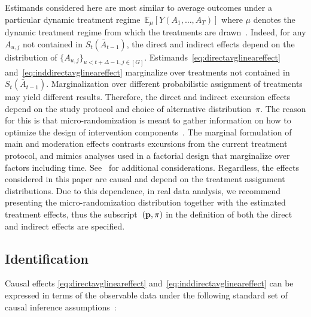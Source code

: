 \documentclass[lineno]{biometrika}
\def\E{\mathbb{E}}
\begin{document}
Estimands considered here are most similar to average outcomes under a particular dynamic treatment regime~$\E_\mu \left[ Y(A_1,\ldots, A_T)\right]$ where $\mu$ denotes the dynamic treatment regime from which the treatments are drawn~\citep{MurphyJASA2001}. Indeed, for any $A_{u,j}$ not contained in $S_t (\bar A_{t-1})$, the direct and indirect effects depend on the distribution of $\{ A_{u,j} \}_{u < t + \Delta -1, j \in [G]}$.  Estimands~\eqref{eq:directavglineareffect} and~\eqref{eq:inddirectavglineareffect} marginalize over treatments not contained in $S_t(\bar A_{t-1})$.  Marginalization over different probabilistic assignment of treatments may yield different results. Therefore, the direct and indirect excursion effects depend on the study protocol and choice of alternative distribution~$\pi$. The reason for this is that micro-randomization is meant to gather information on how to optimize the design of intervention components~\citep{Collins2018}.  The marginal formulation of main and moderation effects contrasts excursions from the current treatment protocol, and mimics analyses used in a factorial design that marginalize over factors including time. See~\citet[Section 8]{Qian2021} for additional considerations.  Regardless, the effects considered in this paper are causal and depend on the treatment assignment distributions.  Due to this dependence, in real data analysis, we recommend presenting the micro-randomization distribution together with the estimated treatment effects, thus the subscript~$({\bf p}, \pi)$ in the definition of both the direct and indirect effects are specified.

\subsection{Identification}
\label{section:prox_effects_data}
Causal effects \eqref{eq:directavglineareffect} and~\eqref{eq:inddirectavglineareffect} can be expressed in terms of the observable data under the following standard set of causal inference assumptions~\citep{Robins}:
\end{document}
